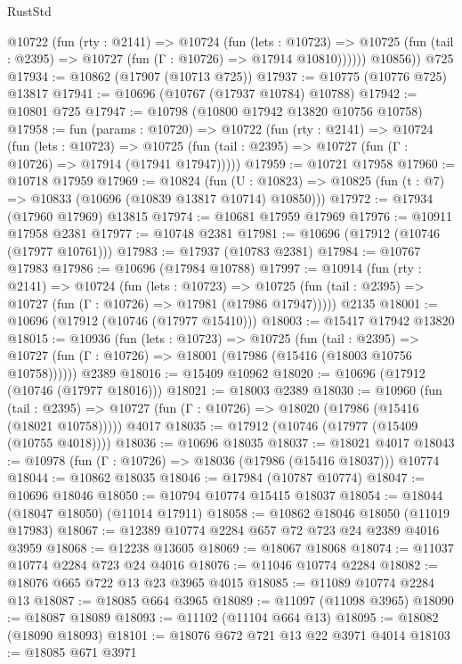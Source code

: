 \begin{lexlean}{RustStd}
\begin{coremodule}
          @10722
            (fun (rty : @2141) =>
            @10724
              (fun (lets : @10723) =>
              @10725 (fun (tail : @2395) => @10727 (fun (Γ : @10726) => @17914 @10810))))))
        @10856))
    @725
@17934 := @10862 (@17907 (@10713 @725))
@17937 := @10775 (@10776 @725) @13817
@17941 := @10696 (@10767 (@17937 @10784) @10788)
@17942 := @10801 @725
@17947 := @10798 (@10800 @17942 @13820 @10756 @10758)
@17958 := fun (params : @10720) =>
  @10722
    (fun (rty : @2141) =>
    @10724
      (fun (lets : @10723) =>
      @10725 (fun (tail : @2395) => @10727 (fun (Γ : @10726) => @17914 (@17941 @17947)))))
@17959 := @10721 @17958
@17960 := @10718 @17959
@17969 := @10824
    (fun (U : @10823) => @10825 (fun (t : @7) => @10833 (@10696 (@10839 @13817 @10714) @10850)))
@17972 := @17934 (@17960 @17969) @13815
@17974 := @10681 @17959 @17969
@17976 := @10911 @17958 @2381
@17977 := @10748 @2381
@17981 := @10696 (@17912 (@10746 (@17977 @10761)))
@17983 := @17937 (@10783 @2381)
@17984 := @10767 @17983
@17986 := @10696 (@17984 @10788)
@17997 := @10914
    (fun (rty : @2141) =>
    @10724
      (fun (lets : @10723) =>
      @10725 (fun (tail : @2395) => @10727 (fun (Γ : @10726) => @17981 (@17986 @17947)))))
    @2135
@18001 := @10696 (@17912 (@10746 (@17977 @15410)))
@18003 := @15417 @17942 @13820
@18015 := @10936
    (fun (lets : @10723) =>
    @10725
      (fun (tail : @2395) =>
      @10727 (fun (Γ : @10726) => @18001 (@17986 (@15416 (@18003 @10756 @10758))))))
    @2389
@18016 := @15409 @10962
@18020 := @10696 (@17912 (@10746 (@17977 @18016)))
@18021 := @18003 @2389
@18030 := @10960
    (fun (tail : @2395) => @10727 (fun (Γ : @10726) => @18020 (@17986 (@15416 (@18021 @10758)))))
    @4017
@18035 := @17912 (@10746 (@17977 (@15409 (@10755 @4018))))
@18036 := @10696 @18035
@18037 := @18021 @4017
@18043 := @10978 (fun (Γ : @10726) => @18036 (@17986 (@15416 @18037))) @10774
@18044 := @10862 @18035
@18046 := @17984 (@10787 @10774)
@18047 := @10696 @18046
@18050 := @10794 @10774 @15415 @18037
@18054 := @18044 (@18047 @18050) (@11014 @17911)
@18058 := @10862 @18046 @18050 (@11019 @17983)
@18067 := @12389 @10774 @2284 @657 @72 @723 @24 @2389 @4016 @3959
@18068 := @12238 @13605
@18069 := @18067 @18068
@18074 := @11037 @10774 @2284 @723 @24 @4016
@18076 := @11046 @10774 @2284
@18082 := @18076 @665 @722 @13 @23 @3965 @4015
@18085 := @11089 @10774 @2284 @13
@18087 := @18085 @664 @3965
@18089 := @11097 (@11098 @3965)
@18090 := @18087 @18089
@18093 := @11102 (@11104 @664 @13)
@18095 := @18082 (@18090 @18093)
@18101 := @18076 @672 @721 @13 @22 @3971 @4014
@18103 := @18085 @671 @3971

\end{coremodule}
\end{lexlean}

